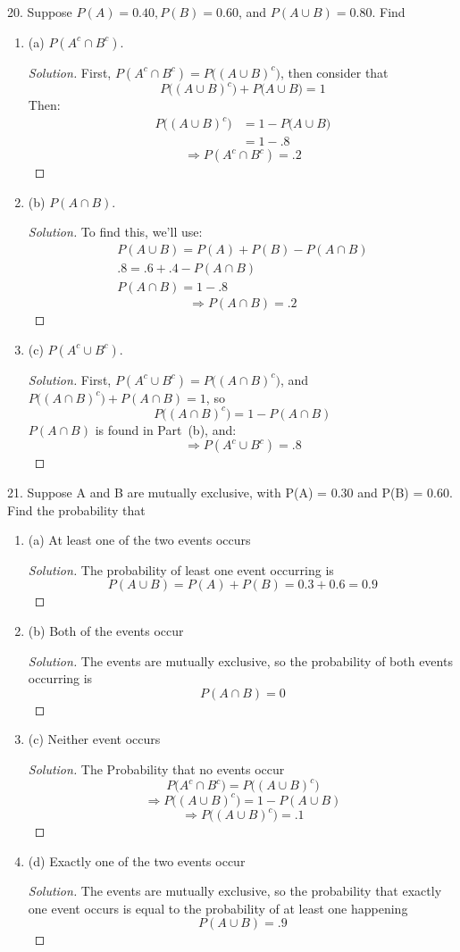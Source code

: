 \documentclass{article}
\newcommand{\be}{\begin{enumerate}}
\newcommand{\ee}{\end{enumerate}}
\begin{document}
\begin{large}
	\item[20.] Suppose $P(A) = 0.40, P(B) = 0.60$, and $P(A \cup B) = 0.80$. Find
	\be
	\item[(a)] $P(A^c \cap B^c)$.
	\begin{proof}[Solution]
	First, $P(A^c \cap B^c) = P\big((A\cup B)^c\big)$, then consider that 
	$$P\big((A\cup B)^c\big) + P\big(A\cup B\big) = 1$$
	Then:
	\begin{align*}
	P\big((A\cup B)^c\big) &= 1 - P\big(A\cup B\big)  \\
	&= 1 - .8
	\end{align*}
	$$\Rightarrow P(A^c \cap B^c) = .2$$
	\end{proof}
	\item[(b)] $P(A \cap B)$.
	\begin{proof}[Solution]
	To find this, we'll use:
	\begin{align*}
	P(A \cup B) = P(A) + P(B) - P(A \cap B) \\
	.8 = .6 + .4 - P(A \cap B) \\
	P(A \cap B) = 1 - .8 
	\end{align*}
	$$\Rightarrow P(A \cap B) = .2$$
	\end{proof}
	\item[(c)] $P(A^c \cup B^c)$.
	\begin{proof}[Solution]
	First, $P(A^c \cup B^c) = P\big((A\cap B)^c\big)$, and $P\big((A\cap B)^c\big) + P(A \cap B) = 1$, so $$P\big((A\cap B)^c\big) = 1 - P(A \cap B)$$
	$P(A \cap B)$ is found in Part~(b), and:
	$$\Rightarrow P(A^c \cup B^c) = .8$$
	\end{proof}
	\ee
	
	\item[21.] Suppose A and B are mutually exclusive, with P(A) = 0.30 and P(B) =
0.60. Find the probability that
	\be
	\item[(a)] At least one of the two events occurs
	\begin{proof}[Solution]
	The probability of least one event occurring is 
	$$P(A \cup B) = P(A) + P(B) = 0.3 + 0.6 = 0.9$$
	\end{proof}
	\item[(b)] Both of the events occur
	\begin{proof}[Solution]
	The events are mutually exclusive, so the probability of both events occurring is
	$$P(A \cap B) = 0$$
	\end{proof}
	\item[(c)] Neither event occurs
	\begin{proof}[Solution]
	The Probability that no events occur
	$$P\big(A^c \cap B^c\big) = P\big((A \cup B)^c\big)$$
	$$\Rightarrow P\big((A\cup B)^c\big) = 1 - P(A\cup B)$$
	$$\Rightarrow P\big((A\cup B)^c\big) = .1$$
	\end{proof}
	\item[(d)] Exactly one of the two events occur
	\begin{proof}[Solution]
	The events are mutually exclusive, so the probability that exactly one event occurs is equal to the probability of at least one happening
	$$P(A \cup B) = .9$$
	\end{proof}
	\ee
		

\end{large}
\end{document}
